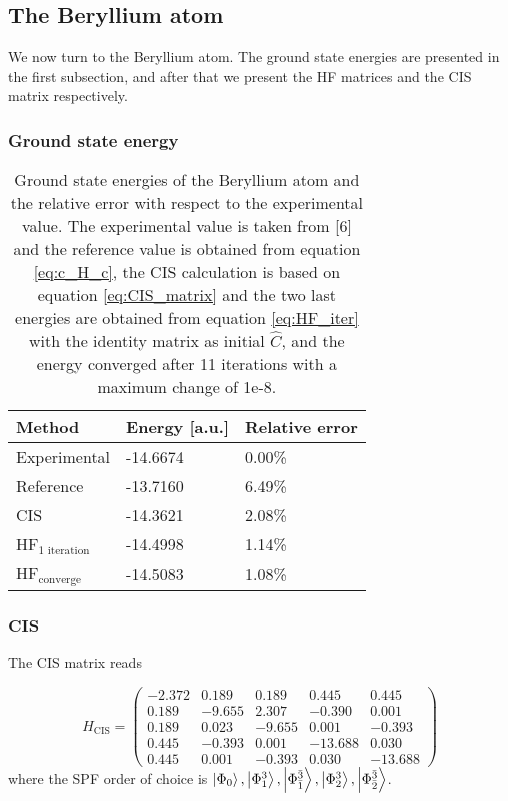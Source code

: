 \subsection{The Beryllium atom}
We now turn to the Beryllium atom. The ground state energies are presented in the first subsection, and after that we present the HF matrices and the CIS matrix respectively. 

\subsubsection{Ground state energy}
\begin{table} [H]
	\caption{Ground state energies of the Beryllium atom and the relative error with respect to the experimental value. The experimental value is taken from [6] and the reference value is obtained from equation \eqref{eq:c_H_c}, the CIS calculation is based on equation \eqref{eq:CIS_matrix} and the two last energies are obtained from equation \eqref{eq:HF_iter} with the identity matrix as initial $\hat{C}$, and the energy converged after 11 iterations with a maximum change of 1e-8.}
	\begin{tabularx}{\textwidth}{X|X|X} \hline\hline
		\textbf{Method}&\textbf{Energy} [a.u.]&\textbf{Relative error}\\ \hline
		Experimental & -14.6674 & 0.00\%  \\
		Reference & -13.7160 & 6.49\% \\
		CIS & -14.3621 &  2.08\% \\
		HF$_{\text{1 iteration}}$ &  -14.4998 & 1.14\% \\
		HF$_{\text{converge}}$ & -14.5083 & 1.08\% \\ \hline\hline
	\end{tabularx}
	\label{tab:gs_be}
\end{table}

\subsubsection{CIS}
The CIS matrix reads

\begin{equation}
\hat{H}_{\text{CIS}}=
\begin{pmatrix}
-2.372 & 0.189 & 0.189 & 0.445 & 0.445\\
0.189 & -9.655 & 2.307 & -0.390 & 0.001\\
0.189 & 0.023 & -9.655 & 0.001 & -0.393\\
0.445 & -0.393 & 0.001 & -13.688 & 0.030\\
0.445 & 0.001 & -0.393 & 0.030 & -13.688
\end{pmatrix}
\label{eq:H_Be}
\end{equation}
where the SPF order of choice is $\ket{\Phi_0}, \ket{\Phi_1^3}, \ket{\Phi_{\bar{1}}^{\bar{3}}}, \ket{\Phi_2^3}, \ket{\Phi_{\bar{2}}^{\bar{3}}}$.

